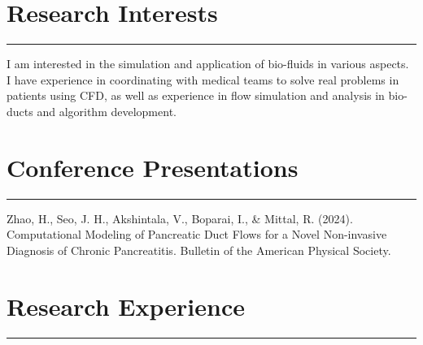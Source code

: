 \documentclass[10pt]{article} %
\begin{document}
\section*{Research Interests}
\hrule

I am interested in the simulation and application of bio-fluids in various aspects. I have experience in coordinating with medical teams to solve real problems in patients using CFD, as well as experience in flow simulation and analysis in bio-ducts and algorithm development.



\section*{Conference Presentations}
\hrule

Zhao, H., Seo, J. H., Akshintala, V., Boparai, I., \& Mittal, R. (2024). Computational Modeling of Pancreatic Duct Flows for a Novel Non-invasive Diagnosis of Chronic Pancreatitis. Bulletin of the American Physical Society.



\vspace{2mm}

\section*{Research Experience}
\hrule
\end{document}

